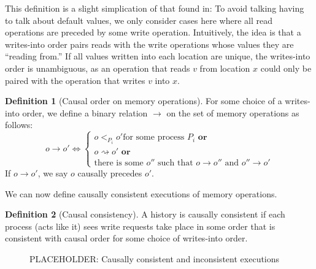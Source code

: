 \documentclass[]             %
{NASA}                       %
\theoremstyle{definition}
\newtheorem{definition}{Definition}[section]
\begin{document}
This definition is a slight simplication of that found
in\citationneeded: To avoid talking having to talk about default
values, we only consider cases here where all read operations are
preceded by some write operation. Intuitively, the idea is that a
writes-into order pairs reads with the write operations whose values
they are ``reading from.'' If all values written into each location
are unique, the writes-into order is unambiguous, as an operation that
reads $v$ from location $x$ could only be paired with the operation
that writes $v$ into $x$.

\begin{definition}[Causal order on memory operations]
  \label{def:memorycausalprecedence}
  For some choice of a writes-into order, we define a binary relation
  $\to$ on the set of memory operations as follows:
  \[o \to o' \iff
  \begin{cases}
    o <_{P_i} o' \textrm{for some process $P_i$}
    \textbf{ or} \\
    o \rightsquigarrow o'
    \textbf{ or} \\
    \textrm{there is some } o'' \textrm{ such that } o \to o'' \textrm{ and } o'' \to o'
  \end{cases}
  \]
  If $o \to o'$, we say $o$ causally precedes $o'$.
\end{definition}

We can now define causally consistent executions of memory operations.

\begin{definition}[Causal consistency]
  \label{def:causalconsistency}
  A history is causally consistent if each process (acts like it) sees
  write requests take place in some order that is consistent with
  causal order for some choice of writes-into order.
\end{definition}

\begin{figure}[p]
  \begin{subfigure}{1\textwidth}
    \centering
    
    \caption{}
    \label{fig:smEx1L1}
  \end{subfigure}

  \begin{subfigure}{1\textwidth}
    
    \caption{}
    \label{fig:smEx5}
  \end{subfigure}

  \caption{PLACEHOLDER: Causally consistent and inconsistent executions}
  \label{fig:smEx3}
\end{figure}
\clearpage
\end{document}
